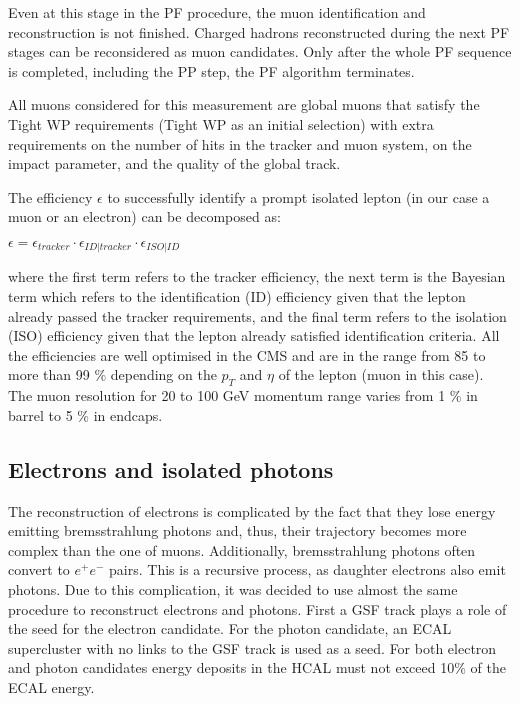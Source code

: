 Even at this stage in the PF procedure, the muon identification and reconstruction is not finished. Charged hadrons reconstructed during the next PF stages can be reconsidered as muon candidates. Only after the whole PF sequence is completed, including the PP step, the PF algorithm terminates.

All muons considered for this measurement are global muons that satisfy the Tight WP requirements (Tight WP as an initial selection) with extra requirements on the number of hits in the tracker and muon system, on the impact parameter, and the quality of the global track. 

The efficiency $\epsilon$ to successfully identify a prompt isolated lepton (in our case a muon or an electron) can be decomposed as:

$\epsilon = \epsilon_{tracker} \cdot \epsilon_{ID | tracker} \cdot \epsilon_{ISO | ID} $

\noindent where the first term refers to the tracker efficiency, the next term is the Bayesian term which refers to the identification (ID) efficiency given that the lepton already passed the tracker requirements, and the final term refers to the isolation (ISO) efficiency given that the lepton already satisfied identification criteria. All the efficiencies are well optimised in the CMS and are in the range from 85 to more than 99 $\%$ depending on the $p_T$ and $\eta$ of the lepton (muon in this case). The muon resolution for 20 to 100 GeV momentum range varies from 1 $\%$ in barrel to 5 $\%$ in endcaps.

\subsection{Electrons and isolated photons}\label{sec:electrons}

The reconstruction of electrons is complicated by the fact that they lose energy emitting bremsstrahlung photons and, thus, their trajectory becomes more complex than the one of muons. Additionally, bremsstrahlung photons often convert to $e^+ e^-$ pairs. This is a recursive process, as daughter electrons also emit photons. Due to this complication, it was decided to use almost the same procedure to reconstruct electrons and photons. First a GSF track plays a role of the seed for the electron candidate. For the photon candidate, an ECAL supercluster with no links to the GSF track is used as a seed. For both electron and photon candidates energy deposits in the HCAL must not exceed 10$\%$ of the ECAL energy. 

